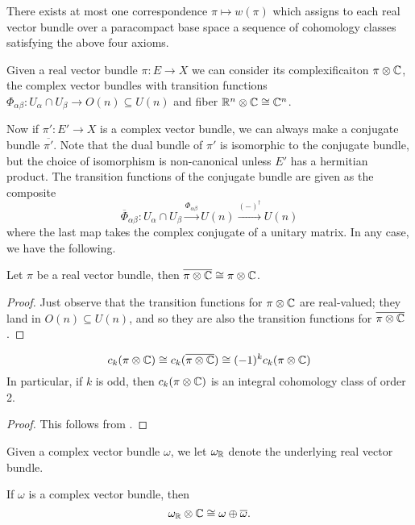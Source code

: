\documentclass[ma3408.tex]{subfiles}
\begin{document}
\begin{Thm}\label{thm:uniqueness-of-sw-classes}
There exists at most one correspondence $\pi \mapsto w(\pi)$ which assigns to each real vector bundle over a paracompact base space a sequence of cohomology classes satisfying the above four axioms. 
\end{Thm}
\begin{Rem}
Given a real vector bundle $\pi \colon E \to X$ we can consider its complexificaiton $\pi \otimes \mathbb{C}$, the complex vector bundles with transition functions $\Phi_{\alpha\beta} \colon U_{\alpha} \cap U_{\beta} \to O(n) \subseteq U(n)$ and fiber $\mathbb{R}^n \otimes \mathbb{C} \cong \mathbb{C}^n$. 

Now if $\pi' \colon E' \to X$ is a complex vector bundle, we can always make a conjugate bundle $\overline{\pi'}$. Note that the dual bundle of $\pi'$ is isomorphic to the conjugate bundle, but the choice of isomorphism is non-canonical unless $E'$ has a hermitian product. The transition functions of the conjugate bundle are given as the composite
\[
\overline{\Phi}_{\alpha\beta} \colon U_{\alpha} \cap U_{\beta} \xrightarrow{\Phi_{\alpha\beta}} U(n) \xrightarrow{(-)^\dagger} U(n)
\]
where the last map takes the complex conjugate of a unitary matrix. In any case, we have the following.
\end{Rem}
\begin{Lem}\label{lem:real-bundle-complexification}
Let $\pi$ be a real vector bundle, then $\overline{\pi \otimes \mathbb{C}} \cong \pi \otimes \mathbb{C}$. 
\end{Lem}
\begin{proof}
Just observe that the transition functions for $\pi \otimes \mathbb{C}$ are real-valued; they land in $O(n) \subseteq U(n)$, and so they are also the transition functions for $\overline{\pi \otimes \mathbb{C}}$. 
\end{proof}
\begin{Prop}\label{prop:chern-classes-of-complexification}
\[
 c_k(\pi \otimes \mathbb{C}) \cong c_k(\overline{\pi \otimes \mathbb{C}}) \cong (-1)^k  c_k(\pi \otimes \mathbb{C})
\]
In particular, if $k$ is odd, then $c_k(\pi \otimes \mathbb{C})$ is an integral cohomology class of order 2. 
\end{Prop}
\begin{proof}
This follows from .
\end{proof}
Given a complex vector bundle $\omega$, we let $\omega_{\mathbb{R}}$ denote the underlying real vector bundle. 
\begin{Prop}\label{prop:real-of-a-complex}
If $\omega$ is a complex vector bundle, then 
\[
\omega_{\mathbb{R}} \otimes \mathbb{C} \cong \omega \oplus \overline{\omega}.
\]
\end{Prop}
\end{document}
